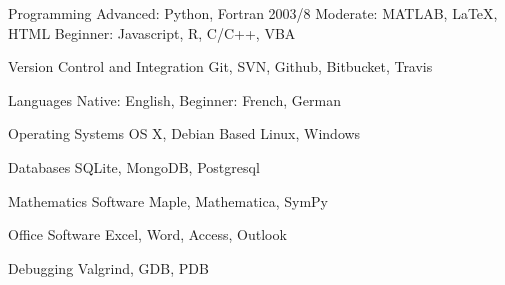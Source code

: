 

\begin{cvskills}

  \cvskill
    {Programming} %
    {Advanced: Python, Fortran 2003/8 Moderate: MATLAB, LaTeX, HTML
    Beginner: Javascript, R, C/C++, VBA} %

  \cvskill
    {Version Control and Integration} %
    {Git, SVN, Github, Bitbucket, Travis} %

  \cvskill
    {Languages} %
    {Native: English, Beginner: French, German} %

  \cvskill
    {Operating Systems} %
    {OS X, Debian Based Linux, Windows} %

  \cvskill
    {Databases} %
    {SQLite, MongoDB, Postgresql} %

  \cvskill
    {Mathematics Sof\/tware} %
    {Maple, Mathematica, SymPy} %

  \cvskill
    {Office Sof\/tware} %
    {Excel, Word, Access, Outlook} %
    
  \cvskill
    {Debugging} %
    {Valgrind, GDB, PDB} %
      
\end{cvskills}
